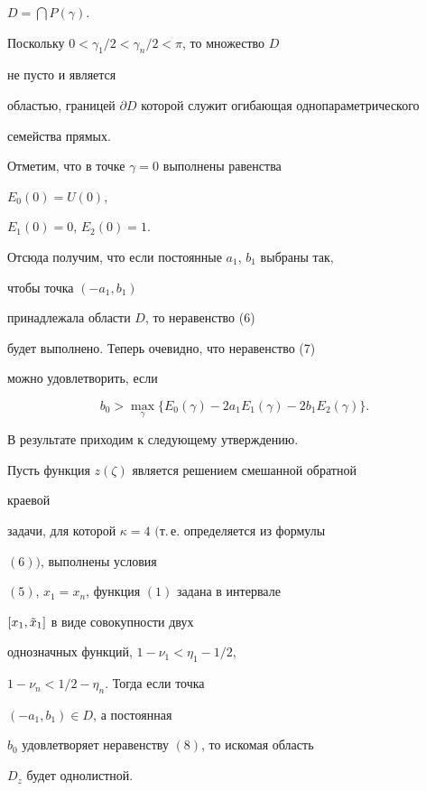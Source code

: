 $D=\bigcap P(\gamma)$.


Поскольку $0<\gamma_{1}/2<\gamma_{n}/2<\pi$, то множество $D$


не пусто и является


областью, границей $\partial D$ которой служит огибающая однопараметрического 


семейства прямых.





Отметим, что в точке $\gamma=0$ выполнены равенства


$E_0(0)=U(0)$,


$E_1(0)=0$, $E_2(0)=1$.


Отсюда получим, что если постоянные $a_1$, $b_1$ выбраны так,


чтобы точка $(-a_1,b_1)$


принадлежала области $D$, то неравенство (6)


будет выполнено. Теперь очевидно, что неравенство (7)


можно удовлетворить, если


\begin{equation}


b_0>\max_{\gamma}\{E_0(\gamma)-2a_1E_1(\gamma)-2b_1E_2(\gamma)\}.


\end{equation}





В результате приходим к следующему утверждению.





\begin{thm} Пусть функция $z(\zeta)$ является решением смешанной обратной 


краевой


задачи, для которой $\kappa=4$ $($т.\,е. определяется из формулы


$(6))$, выполнены условия


$(5)$, $x_1=x_n$, функция $(1)$ задана в интервале


$[x_1,\Tilde x_1]$ в виде совокупности двух


однозначных функций, $1-\nu_1<\eta_1-1/2$,


$1-\nu_n<1/2-\eta_n$. Тогда если точка


$(-a_1,b_1)\in D$, а постоянная


$b_0$ удовлетворяет неравенству $(8)$, то искомая область


$D_z$ будет однолистной.


\end{thm}





